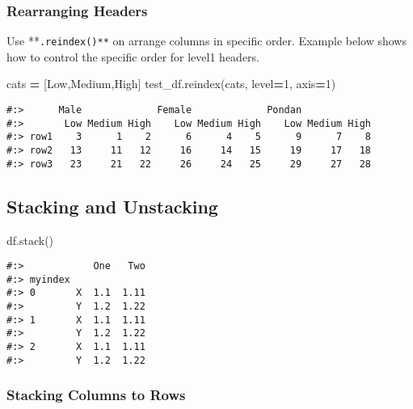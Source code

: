 \documentclass[
]{book}
\newenvironment{Shaded}{\begin{snugshade}}{\end{snugshade}}
\newcommand{\DecValTok}[1]{\textcolor[rgb]{0.06,0.06,0.06}{#1}}
\newcommand{\NormalTok}[1]{#1}
\newcommand{\OperatorTok}[1]{\textcolor[rgb]{0.43,0.43,0.43}{\textbf{#1}}}
\newcommand{\StringTok}[1]{\textcolor[rgb]{0.5,0.5,0.5}{#1}}
\begin{document}
\hypertarget{rearranging-headers}{%
\subsubsection{Rearranging Headers}\label{rearranging-headers}}

Use **\texttt{.reindex()**} on arrange columns in specific order. Example below shows how to control the specific order for level1 headers.

\begin{Shaded}
\begin{Highlighting}[]
\NormalTok{cats }\OperatorTok{=}\NormalTok{ [}\StringTok{\textquotesingle{}Low\textquotesingle{}}\NormalTok{,}\StringTok{\textquotesingle{}Medium\textquotesingle{}}\NormalTok{,}\StringTok{\textquotesingle{}High\textquotesingle{}}\NormalTok{]}
\NormalTok{test\_df.reindex(cats, level}\OperatorTok{=}\DecValTok{1}\NormalTok{, axis}\OperatorTok{=}\DecValTok{1}\NormalTok{)}
\end{Highlighting}
\end{Shaded}

\begin{verbatim}
#:>      Male             Female             Pondan            
#:>       Low Medium High    Low Medium High    Low Medium High
#:> row1    3      1    2      6      4    5      9      7    8
#:> row2   13     11   12     16     14   15     19     17   18
#:> row3   23     21   22     26     24   25     29     27   28
\end{verbatim}

\hypertarget{stacking-and-unstacking}{%
\subsection{Stacking and Unstacking}\label{stacking-and-unstacking}}

\begin{Shaded}
\begin{Highlighting}[]
\NormalTok{df.stack()}
\end{Highlighting}
\end{Shaded}

\begin{verbatim}
#:>            One   Two
#:> myindex             
#:> 0       X  1.1  1.11
#:>         Y  1.2  1.22
#:> 1       X  1.1  1.11
#:>         Y  1.2  1.22
#:> 2       X  1.1  1.11
#:>         Y  1.2  1.22
\end{verbatim}

\hypertarget{stacking-columns-to-rows}{%
\subsubsection{Stacking Columns to Rows}\label{stacking-columns-to-rows}}
\end{document}
